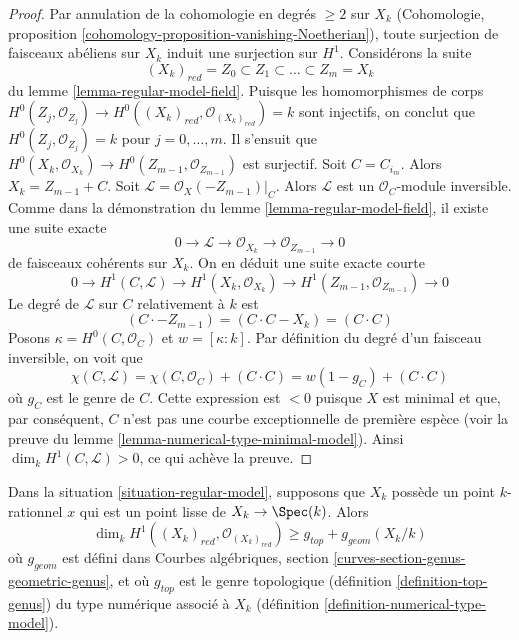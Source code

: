 \begin{proof}
Par annulation de la cohomologie en degrés $\geq 2$ sur $X_k$
(Cohomologie, proposition \ref{cohomology-proposition-vanishing-Noetherian}),
toute surjection de faisceaux abéliens sur $X_k$ induit une surjection sur $H^1$.
Considérons la suite
$$
(X_k)_{red} = Z_0 \subset Z_1 \subset \ldots \subset Z_m = X_k
$$
du lemme \ref{lemma-regular-model-field}. Puisque les homomorphismes de corps
$H^0(Z_j, \mathcal{O}_{Z_j}) \to
H^0((X_k)_{red}, \mathcal{O}_{(X_k)_{red}}) = k$
sont injectifs, on conclut que $H^0(Z_j, \mathcal{O}_{Z_j}) = k$ pour
$j = 0, \ldots, m$. Il s'ensuit que
$H^0(X_k, \mathcal{O}_{X_k}) \to H^0(Z_{m - 1}, \mathcal{O}_{Z_{m - 1}})$
est surjectif. Soit $C = C_{i_m}$. Alors $X_k = Z_{m - 1} + C$.
Soit $\mathcal{L} = \mathcal{O}_X(-Z_{m - 1})|_C$.
Alors $\mathcal{L}$ est un $\mathcal{O}_C$-module inversible.
Comme dans la démonstration du lemme \ref{lemma-regular-model-field},
il existe une suite exacte
$$
0 \to \mathcal{L} \to \mathcal{O}_{X_k} \to \mathcal{O}_{Z_{m - 1}} \to 0
$$
de faisceaux cohérents sur $X_k$. On en déduit
une suite exacte courte
$$
0 \to
H^1(C, \mathcal{L}) \to H^1(X_k, \mathcal{O}_{X_k}) \to
H^1(Z_{m - 1}, \mathcal{O}_{Z_{m - 1}}) \to 0
$$
Le degré de $\mathcal{L}$ sur $C$ relativement à $k$ est
$$
(C \cdot -Z_{m - 1}) = (C \cdot C - X_k) = (C \cdot C)
$$
Posons $\kappa = H^0(C, \mathcal{O}_C)$ et $w = [\kappa : k]$.
Par définition du degré d'un faisceau inversible, on voit que
$$
\chi(C, \mathcal{L}) =
\chi(C, \mathcal{O}_C) + (C \cdot C) =
w(1 - g_C) + (C \cdot C)
$$
où $g_C$ est le genre de $C$. Cette expression est $< 0$ puisque $X$ est
minimal et que, par conséquent, $C$ n'est pas une courbe exceptionnelle de
première espèce (voir la preuve du lemme
\ref{lemma-numerical-type-minimal-model}). Ainsi
$\dim_k H^1(C, \mathcal{L}) > 0$, ce qui achève la preuve.
\end{proof}

\begin{lemma}
\label{lemma-genus-reduction-bigger-than}
Dans la situation \ref{situation-regular-model}, supposons que $X_k$ possède
un point $k$-rationnel $x$ qui est un point lisse de
$X_k \to \Spec(k)$. Alors
$$
\dim_k H^1((X_k)_{red}, \mathcal{O}_{(X_k)_{red}}) \geq
g_{top} + g_{geom}(X_k/k)
$$
où $g_{geom}$ est défini dans Courbes algébriques, section
\ref{curves-section-genus-geometric-genus}, et où $g_{top}$ est le genre
topologique (définition \ref{definition-top-genus}) du type numérique
associé à $X_k$ (définition \ref{definition-numerical-type-model}).
\end{lemma}

